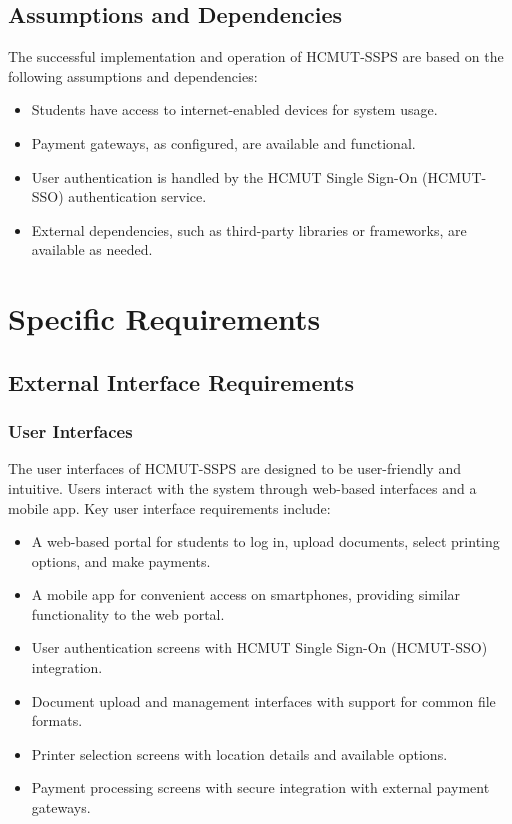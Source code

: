 \documentclass{article}
\begin{document}
\subsection{Assumptions and Dependencies}
The successful implementation and operation of HCMUT-SSPS are based on the following assumptions and dependencies:
\begin{itemize}
    \item Students have access to internet-enabled devices for system usage.
    \item Payment gateways, as configured, are available and functional.
    \item User authentication is handled by the HCMUT Single Sign-On (HCMUT-SSO) authentication service.
    \item External dependencies, such as third-party libraries or frameworks, are available as needed.
\end{itemize}


\section{Specific Requirements}

\subsection{External Interface Requirements}

\subsubsection{User Interfaces}
The user interfaces of HCMUT-SSPS are designed to be user-friendly and intuitive. Users interact with the system through web-based interfaces and a mobile app. Key user interface requirements include:

\begin{itemize}
    \item A web-based portal for students to log in, upload documents, select printing options, and make payments.
    \item A mobile app for convenient access on smartphones, providing similar functionality to the web portal.
    \item User authentication screens with HCMUT Single Sign-On (HCMUT-SSO) integration.
    \item Document upload and management interfaces with support for common file formats.
    \item Printer selection screens with location details and available options.
    \item Payment processing screens with secure integration with external payment gateways.
\end{itemize}
\end{document}
